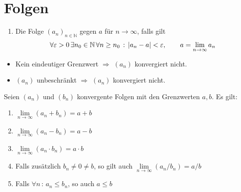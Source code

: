 \section{Folgen}
		\begin{definition}[Konvergenz] \hfill
			\begin{enumerate}
				\item Die Folge $(a_n)_{n \in \mathbb{N}}$  gegen $a$ für $n \to \infty$, falls gilt
				$$ \forall \varepsilon > 0 \, \exists n_0 \in \mathbb{N} \, \forall n \geq n_0 \, : \, \left\vert a_n - a \right\vert < \varepsilon , \qquad a = \lim\limits_{n \to \infty} a_n $$
			\end{enumerate}
		\end{definition}
		\begin{proofhelp} \hfill
			\begin{itemize}
				\item Kein eindeutiger Grenzwert $\Rightarrow$ $(a_n)$ konvergiert nicht.
				\item $(a_n)$ unbeschränkt $\Rightarrow$ $(a_n)$ konvergiert nicht.
			\end{itemize}
		\end{proofhelp}
		\begin{theorem}[Rechenregeln]
			Seien $(a_n)$ und $(b_n)$ konvergente Folgen mit den Grenzwerten $a, b$. Es gilt:
			\begin{enumerate}
				\item $\lim\limits_{n \to \infty} (a_n + b_n) = a + b$
				\item $\lim\limits_{n \to \infty} (a_n - b_n) = a - b$
				\item $\lim\limits_{n \to \infty} (a_n \cdot b_n) = a \cdot b$
				\item Falls zusätzlich $b_n \neq 0 \neq b$, so gilt auch $\lim\limits_{n \to \infty} (a_n / b_n) = a / b$
				\item Falls $ \forall n \, : \, a_n \leq b_n$, so auch $a \leq b$
			\end{enumerate}
		\end{theorem}
	
